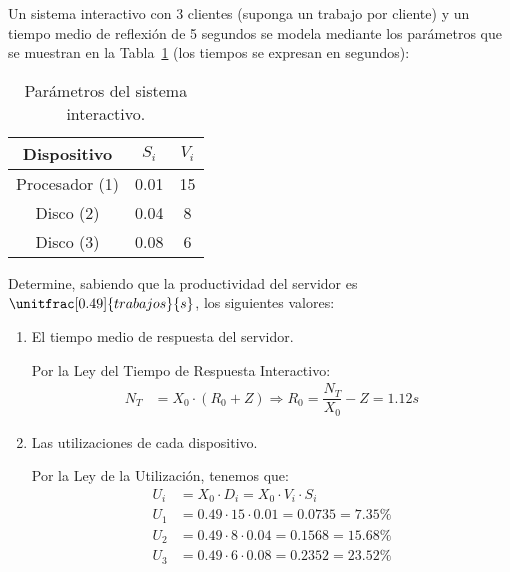 \begin{ejercicio}\label{ej:5.25}
    Un sistema interactivo con 3 clientes (suponga un trabajo por cliente) y un tiempo medio de reflexión de 5 segundos se modela mediante los parámetros que se muestran en la Tabla~\ref{tab:5.25} (los tiempos se expresan en segundos):
    \begin{table}[h]
        \centering
        \begin{tabular}{|c|c|c|}
            \hline
            Dispositivo & $S_i$ & $V_i$ \\
            \hline
            Procesador (1) & 0.01 & 15 \\
            Disco (2) & 0.04 & 8 \\
            Disco (3) & 0.08 & 6 \\
            \hline
        \end{tabular}
        \caption{Parámetros del sistema interactivo.}
        \label{tab:5.25}
    \end{table}
    Determine, sabiendo que la productividad del servidor es $\unitfrac[0.49]{trabajos}{s}$, los siguientes valores:
    \begin{enumerate}
        \item El tiempo medio de respuesta del servidor.
        
        Por la Ley del Tiempo de Respuesta Interactivo:
        \begin{align*}
            N_T &= X_0 \cdot (R_0 + Z)
            \Longrightarrow R_0 = \dfrac{N_T}{X_0} - Z = 1.12 \unit{s}
        \end{align*}
        \item Las utilizaciones de cada dispositivo.
        
        Por la Ley de la Utilización, tenemos que:
        \begin{align*}
            U_i &= X_0 \cdot D_i
            = X_0 \cdot V_i \cdot S_i\\
            U_1 &= 0.49 \cdot 15 \cdot 0.01 = 0.0735 = 7.35\% \\
            U_2 &= 0.49 \cdot 8 \cdot 0.04 = 0.1568 = 15.68\% \\
            U_3 &= 0.49 \cdot 6 \cdot 0.08 = 0.2352 = 23.52\%
        \end{align*}
    \end{enumerate}
\end{ejercicio}
\begin{comment}
\solucion
    \begin{enumerate}
        \item $R_0 = 1.1$ s.
        \item $U_1 = 0.07$, $U_2 = 0.16$, $U_3 = 0.24$.
    \end{enumerate}
\end{comment}

